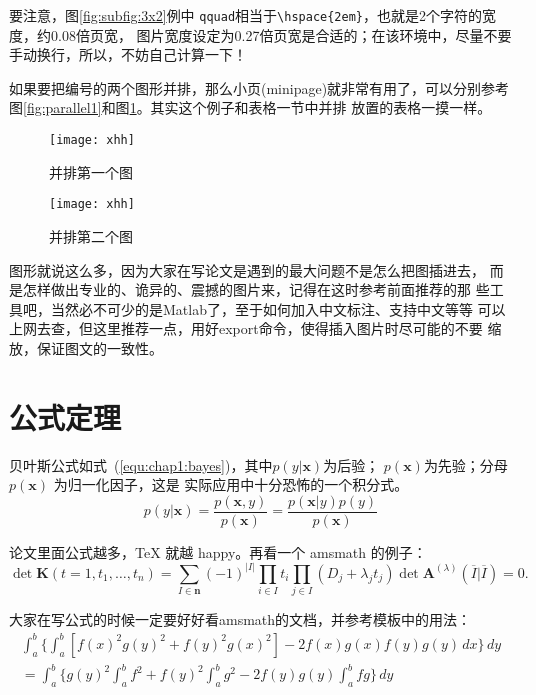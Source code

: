 {要注意，图\ref{fig:subfig:3x2}例中
\texttt{qquad}相当于\verb|\hspace{2em}|，也就是2个字符的宽度，约0.08倍页宽，
图片宽度设定为0.27倍页宽是合适的；在该环境中，尽量不要手动换行，所以，不妨自己计算一下！

如果要把编号的两个图形并排，那么小页(minipage)就非常有用了，可以分别参考
图\ref{fig:parallel1}和图\ref{fig:parallel2}。其实这个例子和表格一节中并排
放置的表格一摸一样。
\begin{figure}[htb]
\begin{minipage}{0.48\textwidth}
  \centering
  \texttt{[image: xhh]}
  \caption{并排第一个图}
  \label{fig:parallel1}
\end{minipage}\hfill
\begin{minipage}{0.48\textwidth}
  \centering
  \texttt{[image: xhh]}
  \caption{并排第二个图}
  \label{fig:parallel2}
\end{minipage}
\end{figure}

图形就说这么多，因为大家在写论文是遇到的最大问题不是怎么把图插进去，
而是怎样做出专业的、诡异的、震撼的图片来，记得在这时参考前面推荐的那
些工具吧，当然必不可少的是Matlab了，至于如何加入中文标注、支持中文等等
可以上网去查，但这里{\kai 推荐一点}，用好export命令，使得插入图片时尽可能的不要
缩放，保证图文的一致性。

\section{公式定理}
\label{sec:equation}
贝叶斯公式如式~(\ref{equ:chap1:bayes})，其中$p(y|\mathbf{x})$为后验；
$p(\mathbf{x})$为先验；分母$p(\mathbf{x})$ 为归一化因子，这是
实际应用中十分恐怖的一个积分式。
\begin{equation}
\label{equ:chap1:bayes}
p(y|\mathbf{x}) = \frac{p(\mathbf{x},y)}{p(\mathbf{x})}=
\frac{p(\mathbf{x}|y)p(y)}{p(\mathbf{x})} 
\end{equation}

论文里面公式越多，\TeX{} 就越 happy。再看一个 \textsf{amsmath} 的例子：
\newcommand{\envert}[1]{\left\lvert#1\right\rvert} 
\begin{equation}\label{detK2}
\det\mathbf{K}(t=1,t_1,\dots,t_n)=\sum_{I\in\mathbf{n}}(-1)^{\envert{I}}
\prod_{i\in I}t_i\prod_{j\in I}(D_j+\lambda_jt_j)\det\mathbf{A}
^{(\lambda)}(\overline{I}|\overline{I})=0.
\end{equation} 

大家在写公式的时候一定要好好看\textsf{amsmath}的文档，并参考模板中的用法：
\begin{multline*}%
\int_a^b\biggl\{\int_a^b[f(x)^2g(y)^2+f(y)^2g(x)^2]
 -2f(x)g(x)f(y)g(y)\,dx\biggr\}\,dy \\
 =\int_a^b\biggl\{g(y)^2\int_a^bf^2+f(y)^2
  \int_a^b g^2-2f(y)g(y)\int_a^b fg\biggr\}\,dy
\end{multline*}

}
